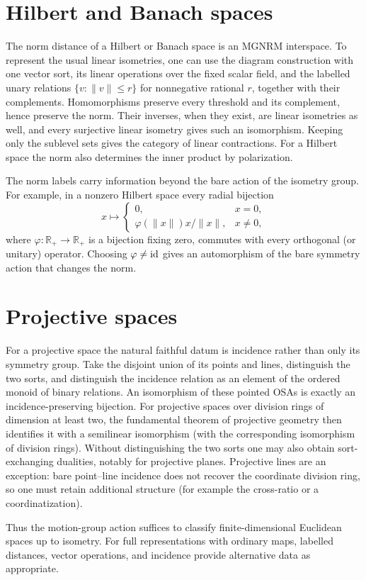 \section{Hilbert and Banach spaces}

The norm distance of a Hilbert or Banach space is an MGNRM interspace.
To represent the usual linear isometries, one can use the diagram
construction with one vector sort, its linear operations over the fixed
scalar field, and the labelled unary relations
$\{v:\lVert v\rVert\le r\}$ for nonnegative rational $r$, together with
their complements. Homomorphisms preserve every threshold and its
complement, hence preserve the norm. Their inverses, when they exist, are
linear isometries as well, and every surjective linear isometry gives
such an isomorphism. Keeping only the sublevel sets gives the category
of linear contractions. For a Hilbert space the norm also determines
the inner product by polarization.

The norm labels carry information beyond the bare action of the
isometry group. For example, in a nonzero Hilbert space every radial
bijection
\[
 x\longmapsto
 \begin{cases}
  0,&x=0,\\
  \varphi(\lVert x\rVert)x/\lVert x\rVert,&x\ne0,
 \end{cases}
\]
where $\varphi:\mathbb R_+\to\mathbb R_+$ is a bijection fixing zero,
commutes with every orthogonal (or unitary) operator. Choosing
$\varphi\ne{\operatorname{id}}$ gives an automorphism of the bare symmetry action that
changes the norm.

\section{Projective spaces}

For a projective space the natural faithful datum is incidence rather than
only its symmetry group.  Take the disjoint union of its points and lines,
distinguish the two sorts, and distinguish the incidence relation as an
element of the ordered monoid of binary relations.  An isomorphism of these
pointed OSAs is exactly an incidence-preserving bijection. For projective
spaces over division rings of dimension at least two, the fundamental
theorem of projective geometry
then identifies it with a semilinear isomorphism (with the corresponding
isomorphism of division rings).  Without distinguishing the two sorts one
may also obtain sort-exchanging dualities, notably for projective planes.
Projective lines are an exception: bare point--line incidence does not
recover the coordinate division ring, so one must retain additional
structure (for example the cross-ratio or a coordinatization).

Thus the motion-group action suffices to classify finite-dimensional
Euclidean spaces up to isometry. For full representations with ordinary
maps, labelled distances, vector operations, and incidence provide
alternative data as appropriate.
